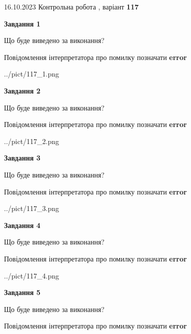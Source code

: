 \documentclass[12pt, ukrainian]{article}
\begin{document}
{\Large{16.10.2023 Контрольна робота , варіант  \No \textbf { 117 }\par}}
{
\begin {large}
{\begin {center}\textbf{Завдання 1}\end {center}}\par
Що буде виведено за виконання? \par
Повідомлення інтерпретатора про помилку позначати \textbf{error}

\begin{center}
	{../pict/117_1.png}
\end{center}
\newpage

{\begin {center}\textbf{Завдання 2}\end {center}}\par
Що буде виведено за виконання? \par
Повідомлення інтерпретатора про помилку позначати \textbf{error}

\begin{center}
	{../pict/117_2.png}
\end{center}
\newpage

{\begin {center}\textbf{Завдання 3}\end {center}}\par
Що буде виведено за виконання? \par
Повідомлення інтерпретатора про помилку позначати \textbf{error}

\begin{center}
	{../pict/117_3.png}
\end{center}
\newpage

{\begin {center}\textbf{Завдання 4}\end {center}}\par
Що буде виведено за виконання? \par
Повідомлення інтерпретатора про помилку позначати \textbf{error}

\begin{center}
	{../pict/117_4.png}
\end{center}
\newpage

{\begin {center}\textbf{Завдання 5}\end {center}}\par
Що буде виведено за виконання? \par
Повідомлення інтерпретатора про помилку позначати \textbf{error}


\end{large}}
\end{document}
